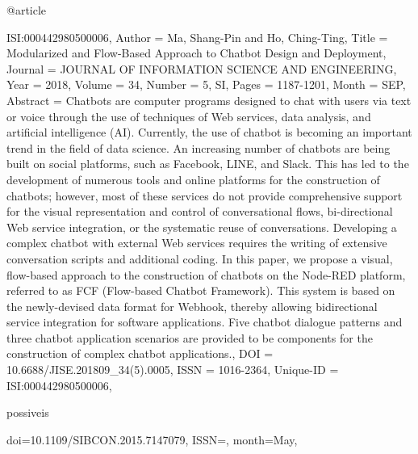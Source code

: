 
@article{ ISI:000442980500006,
Author = {Ma, Shang-Pin and Ho, Ching-Ting},
Title = {{Modularized and Flow-Based Approach to Chatbot Design and Deployment}},
Journal = {{JOURNAL OF INFORMATION SCIENCE AND ENGINEERING}},
Year = {{2018}},
Volume = {{34}},
Number = {{5, SI}},
Pages = {{1187-1201}},
Month = {{SEP}},
Abstract = {{Chatbots are computer programs designed to chat with users via text or
   voice through the use of techniques of Web services, data analysis, and
   artificial intelligence (AI). Currently, the use of chatbot is becoming
   an important trend in the field of data science. An increasing number of
   chatbots are being built on social platforms, such as Facebook, LINE,
   and Slack. This has led to the development of numerous tools and online
   platforms for the construction of chatbots; however, most of these
   services do not provide comprehensive support for the visual
   representation and control of conversational flows, bi-directional Web
   service integration, or the systematic reuse of conversations.
   Developing a complex chatbot with external Web services requires the
   writing of extensive conversation scripts and additional coding. In this
   paper, we propose a visual, flow-based approach to the construction of
   chatbots on the Node-RED platform, referred to as FCF (Flow-based
   Chatbot Framework). This system is based on the newly-devised data
   format for Webhook, thereby allowing bidirectional service integration
   for software applications. Five chatbot dialogue patterns and three
   chatbot application scenarios are provided to be components for the
   construction of complex chatbot applications.}},
DOI = {{10.6688/JISE.201809\_34(5).0005}},
ISSN = {{1016-2364}},
Unique-ID = {{ISI:000442980500006}},



possiveis

doi={10.1109/SIBCON.2015.7147079}, 
ISSN={}, 
month={May},}
